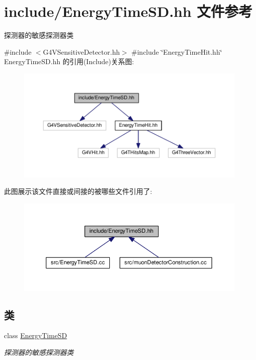 \hypertarget{EnergyTimeSD_8hh}{}\section{include/\+Energy\+Time\+SD.hh 文件参考}
\label{EnergyTimeSD_8hh}


探测器的敏感探测器类  


{\ttfamily \#include $<$G4\+V\+Sensitive\+Detector.\+hh$>$}\newline
{\ttfamily \#include \char`\"{}Energy\+Time\+Hit.\+hh\char`\"{}}\newline
Energy\+Time\+S\+D.\+hh 的引用(Include)关系图\+:\nopagebreak
\begin{figure}[H]
\begin{center}
\leavevmode
\includegraphics[width=350pt]{EnergyTimeSD_8hh__incl}
\end{center}
\end{figure}
此图展示该文件直接或间接的被哪些文件引用了\+:\nopagebreak
\begin{figure}[H]
\begin{center}
\leavevmode
\includegraphics[width=350pt]{EnergyTimeSD_8hh__dep__incl}
\end{center}
\end{figure}
\subsection*{类}
\begin{DoxyCompactItemize}
\item 
class \hyperlink{classEnergyTimeSD}{Energy\+Time\+SD}
\begin{DoxyCompactList}\small\item\em 探测器的敏感探测器类 \end{DoxyCompactList}\end{DoxyCompactItemize}


